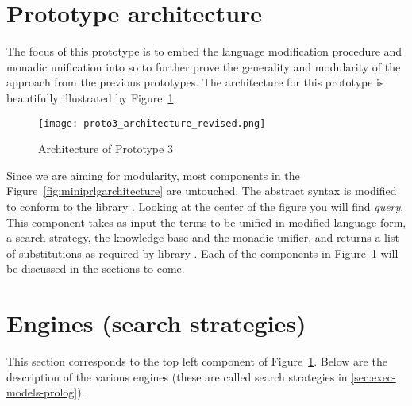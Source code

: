 \documentclass[thesis-solanki.tex]{files}
\begin{document}
\section{Prototype architecture}

The focus of this prototype is to embed the language modification procedure and monadic unification into
\cite{website:mini-prolog-hugs98} so to further prove the generality and modularity of the approach from the
previous prototypes.
The architecture for this prototype is beautifully illustrated by Figure~\ref{fig:architecture-proto-3}.

\begin{figure}[H]
  \texttt{[image: proto3\_architecture\_revised.png]}
\vspace*{-1cm}
  \caption{Architecture of Prototype 3}
  \label{fig:architecture-proto-3}
\end{figure}

Since we are aiming for modularity, most components in the Figure~\ref{fig:miniprlgarchitecture} are untouched.
The abstract syntax is modified to conform to the  library \cite{unification-fd-lib}.
Looking at the center of the figure you will find \textit{query}.
This component takes as input the terms to be unified in modified language form, a search strategy, the knowledge
base and the monadic unifier, and returns a list of substitutions as required by  library \cite{website:mini-prolog-hugs98}.
Each of the components in Figure~\ref{fig:architecture-proto-3} will be discussed in the sections to come.


\section{Engines (search strategies)}
This section corresponds to the top left component of Figure~\ref{fig:architecture-proto-3}.
Below are the description of the various engines (these are called search strategies in
\ref{sec:exec-models-prolog}).
\end{document}
